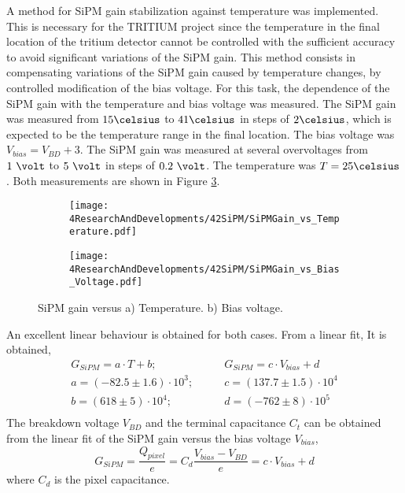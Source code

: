 A method for SiPM gain stabilization against temperature was implemented. This is necessary for the TRITIUM project since the temperature in the final location of the tritium detector cannot be controlled with the sufficient accuracy to avoid significant variations of the SiPM gain. This method consists in compensating variations of the SiPM gain caused by temperature changes, by controlled modification of the bias voltage. For this task, the dependence of the SiPM gain with the temperature and bias voltage was measured. The SiPM gain was measured from $15\celsius$ to $41\celsius$ in steps of $2\celsius$, which is expected to be the temperature range in the final location. The bias voltage was $V_{bias} = V_{BD}+3$. The SiPM gain was measured at several overvoltages from $1~\volt$ to $5~\volt$ in steps of $0.2~\volt$. The temperature was $T=25\celsius$. Both measurements are shown in Figure \ref{fig:SiPMGainDependance}.\begin{figure}
\centering
    \begin{subfigure}[b]{0.9\textwidth}
    \centering
    \texttt{[image: 4ResearchAndDevelopments/42SiPM/SiPMGain\_vs\_Temperature.pdf]}  
    \caption{\label{subfig:SiPMGainvsTemperature}}
    \end{subfigure}
    \hfill
    \begin{subfigure}[b]{0.9\textwidth}
    \centering
    \texttt{[image: 4ResearchAndDevelopments/42SiPM/SiPMGain\_vs\_Bias\_Voltage.pdf]}  
    \caption{\label{subfig:SiPMGainvsBiasVoltage}}
    \end{subfigure}
 \caption{SiPM gain versus a) Temperature. b) Bias voltage.}
 \label{fig:SiPMGainDependance}
\end{figure}
An excellent linear behaviour is obtained for both cases. From a linear fit, It is obtained,
\begin{equation*}
\begin{split}
G_{SiPM}=a \cdot{} T + b;& \qquad G_{SiPM}=c \cdot{} V_{bias} + d\\
a=\left( -82.5 \pm 1.6 \right) \cdot{} 10^{3};& \qquad c=\left( 137.7 \pm 1.5 \right) \cdot{} 10^{4}\\
b=\left( 618 \pm 5 \right) \cdot{} 10^{4};& \qquad d=\left( -762 \pm 8 \right) \cdot{} 10^{5} \\
\label{SiPMGainVSTempV}
\end{split}
\end{equation*} 
The breakdown voltage $V_{BD}$ and the terminal capacitance $C_t$ can be obtained from the linear fit of the SiPM gain versus the bias voltage $V_{bias}$,
\begin{equation}
G_{SiPM}=\frac{Q_{pixel}}{e} = C_d \frac{V_{bias}-V_{BD}}{e} = c \cdot{} V_{bias}+d
\label{SiPMGain_Capacitance}
\end{equation}
where $C_d$ is the pixel capacitance.

